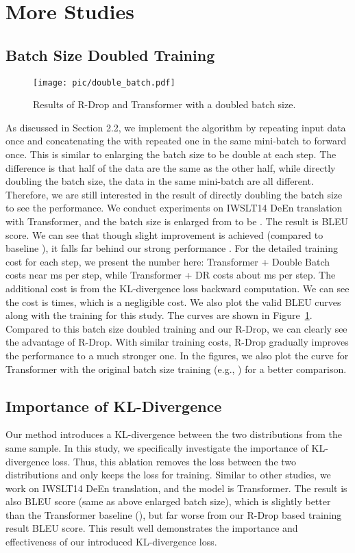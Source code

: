 \documentclass{article}
\begin{document}
\section{More Studies}

\subsection{Batch Size Doubled Training}
\begin{figure}
	\centering
	\texttt{[image: pic/double\_batch.pdf]}
	\caption{Results of R-Drop and Transformer with a doubled batch size.} 
	\label{fig:double_batch}
\end{figure}

\label{sec:double_appendix}
As discussed in Section 2.2, we implement the algorithm by repeating input data  once and concatenating the  with repeated one in the same mini-batch to forward once. This is similar to enlarging the batch size to be double at each step. The difference is that half of the data are the same as the other half, while directly doubling the batch size, the data in the same mini-batch are all different. Therefore, we are still interested in the result of directly doubling the batch size to see the performance. We conduct experiments on IWSLT14 DeEn translation with Transformer, and the batch size is enlarged from  to be . The result is  BLEU score. We can see that though slight improvement is achieved (compared to baseline ), it falls far behind our strong performance . For the detailed training cost for each step, we present the number here: Transformer + Double Batch costs near ms per step, while Transformer + DR costs about ms per step. The additional cost is from the KL-divergence loss backward computation. We can see the cost is  times, which is a negligible cost. We also plot the valid BLEU curves along with the training for this study. The curves are shown in Figure~\ref{fig:double_batch}. Compared to this batch size doubled training and our R-Drop, we can clearly see the advantage of R-Drop. With similar training costs, R-Drop gradually improves the performance to a much stronger one. In the figures, we also plot the curve for Transformer with the original batch size training (e.g., ) for a better comparison. 


\subsection{Importance of KL-Divergence}
Our method introduces a KL-divergence between the two distributions from the same sample. In this study, we specifically investigate the importance of KL-divergence loss. Thus, this ablation removes the  loss between the two distributions and only keeps the  loss for training. Similar to other studies, we work on IWSLT14 DeEn translation, and the model is Transformer. The result is also  BLEU score (same as above enlarged batch size), which is slightly better than the Transformer baseline (), but far worse from our R-Drop based training result  BLEU score. This result well demonstrates the importance and effectiveness of our introduced KL-divergence loss. 
\end{document}
